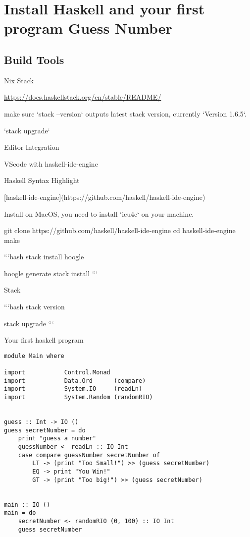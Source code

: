 \chapter{Install Haskell and your first program Guess Number}

 \section{Build Tools}

 Nix
 Stack

\url{https://docs.haskellstack.org/en/stable/README/}

make sure `stack --version` outputs latest stack version, currently `Version 1.6.5`.

`stack upgrade`

 Editor Integration

 VScode with haskell-ide-engine

Haskell Syntax Highlight

[haskell-ide-engine](https://github.com/haskell/haskell-ide-engine)

Install on MacOS, you need to install `icu4c` on your machine.

git clone https://github.com/haskell/haskell-ide-engine
cd haskell-ide-engine
make



```bash
stack install hoogle

hoogle generate
stack install
```

 Stack

```bash
stack version

stack upgrade
```

 Your first haskell program


\begin{verbatim}
module Main where

import           Control.Monad
import           Data.Ord      (compare)
import           System.IO     (readLn)
import           System.Random (randomRIO)


guess :: Int -> IO ()
guess secretNumber = do
    print "guess a number"
    guessNumber <- readLn :: IO Int
    case compare guessNumber secretNumber of
        LT -> (print "Too Small!") >> (guess secretNumber)
        EQ -> print "You Win!"
        GT -> (print "Too big!") >> (guess secretNumber)


main :: IO ()
main = do
    secretNumber <- randomRIO (0, 100) :: IO Int
    guess secretNumber

\end{verbatim}
